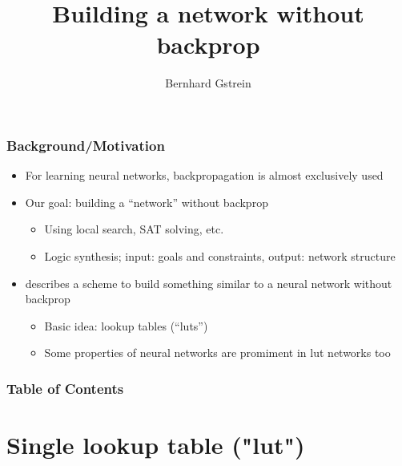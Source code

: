 \documentclass[pdflatex,compress]{beamer}
\title{Building a network without backprop}
\author{Bernhard Gstrein}
\begin{document}
\maketitle

\AtBeginSection[]{}

\begin{frame}
	\frametitle{Background/Motivation}
	\begin{itemize}[<+->]
		\item For learning neural networks, backpropagation is almost exclusively used
			\vspace{1em}
		\item Our goal: building a \enquote{network} without backprop
			\begin{itemize}
				\item Using local search, SAT solving, etc.
				\item Logic synthesis; input: goals and constraints, output: network structure
			\end{itemize}
			\vspace{1em}
		\item \parencite{chatterjee2018learning} describes a scheme to build something similar to a neural network without backprop
			\begin{itemize}
				\item Basic idea: lookup tables (\enquote{luts})
				\item Some properties of neural networks are promiment in lut networks too
			\end{itemize}
	\end{itemize}
\end{frame}


\begin{frame}
	\frametitle{Table of Contents}
\tableofcontents
\end{frame}

\section{Single lookup table ("lut")}
\end{document}
